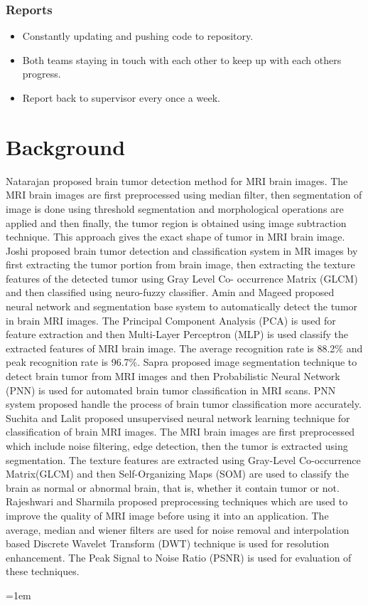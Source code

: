 \documentclass[11pt]{article}
\begin{document}
	\subsubsection[reports]{Reports}
	\begin{itemize}
		\item Constantly updating and pushing code to repository.
		\item Both teams staying in touch with each other to keep up with each
			others progress.
		\item Report back to supervisor every once a week.
	\end{itemize}

	\section[background]{\hfill \Huge Background \hfill}

	Natarajan \cite{bac1} proposed brain tumor detection method for MRI brain
	images. The MRI brain images are first preprocessed using median filter,
	then segmentation of image is done using threshold segmentation and
	morphological operations are applied and then finally, the tumor region is
	obtained using image subtraction technique. This approach gives the exact
	shape of tumor in MRI brain image. Joshi \cite{bac2}  proposed brain tumor
	detection and classification system in MR images by first extracting the
	tumor portion from brain image, then extracting the texture features of the
	detected tumor using Gray Level Co- occurrence Matrix (GLCM) and then
	classified using neuro-fuzzy classifier. Amin and Mageed \cite{bac3}
	proposed neural network and segmentation base system to automatically detect
	the tumor in brain MRI images. The Principal Component Analysis (PCA) is
	used for feature extraction and then Multi-Layer Perceptron (MLP) is used
	classify the extracted features of MRI brain image.  The average recognition
	rate is 88.2\% and peak recognition rate is 96.7\%.  Sapra \cite{bac4}
	proposed image segmentation technique to detect brain tumor from MRI images
	and then Probabilistic Neural Network (PNN)  is used for automated brain
	tumor classification in MRI scans. PNN system proposed handle the process of
	brain tumor classification more accurately. Suchita and Lalit \cite{bac5}
	proposed unsupervised neural network learning technique for classification
	of brain MRI images.  The MRI brain images are first preprocessed which
	include noise filtering, edge detection, then the tumor is extracted using
	segmentation. The texture features are extracted using Gray-Level
	Co-occurrence Matrix(GLCM) and then Self-Organizing Maps (SOM) are used to
	classify the brain as normal or abnormal brain, that is, whether it contain
	tumor or not. Rajeshwari and Sharmila \cite{bac6} proposed preprocessing
	techniques which are used to improve the quality of MRI image before using
	it into an application. The average, median and wiener filters are used for
	noise removal and interpolation based Discrete Wavelet Transform (DWT)
	technique is used for resolution enhancement. The Peak Signal to Noise Ratio
	(PSNR) is used for evaluation of these techniques.

	\emergencystretch=1em
	\printbibliography[title={\hfill \Huge References \hfill}]
\end{document}

